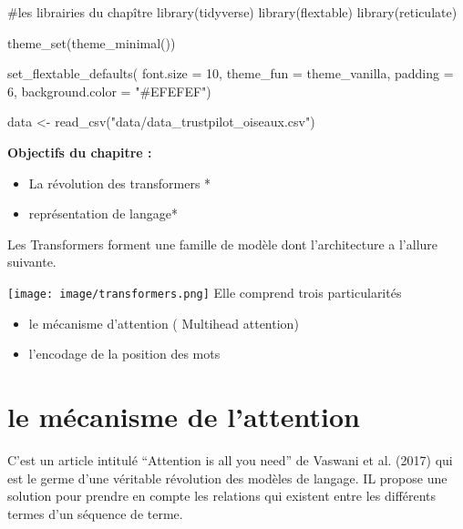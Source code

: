 \documentclass[
  letterpaper,
  DIV=11,
  numbers=noendperiod]{scrreprt}
\newenvironment{Shaded}{\begin{snugshade}}{\end{snugshade}}
\newcommand{\AttributeTok}[1]{\textcolor[rgb]{0.40,0.45,0.13}{#1}}
\newcommand{\CommentTok}[1]{\textcolor[rgb]{0.37,0.37,0.37}{#1}}
\newcommand{\DecValTok}[1]{\textcolor[rgb]{0.68,0.00,0.00}{#1}}
\newcommand{\FunctionTok}[1]{\textcolor[rgb]{0.28,0.35,0.67}{#1}}
\newcommand{\NormalTok}[1]{\textcolor[rgb]{0.00,0.23,0.31}{#1}}
\newcommand{\OtherTok}[1]{\textcolor[rgb]{0.00,0.23,0.31}{#1}}
\newcommand{\StringTok}[1]{\textcolor[rgb]{0.13,0.47,0.30}{#1}}
\providecommand{\tightlist}{%
  \setlength{\itemsep}{0pt}\setlength{\parskip}{0pt}}\usepackage{longtable,booktabs,array}
\begin{document}
\begin{Shaded}
\begin{Highlighting}[]
\CommentTok{\#les librairies du chapître}
\FunctionTok{library}\NormalTok{(tidyverse)}
\FunctionTok{library}\NormalTok{(flextable)}
\FunctionTok{library}\NormalTok{(reticulate)}

\FunctionTok{theme\_set}\NormalTok{(}\FunctionTok{theme\_minimal}\NormalTok{()) }

\FunctionTok{set\_flextable\_defaults}\NormalTok{(}
  \AttributeTok{font.size =} \DecValTok{10}\NormalTok{, }\AttributeTok{theme\_fun =}\NormalTok{ theme\_vanilla,}
  \AttributeTok{padding =} \DecValTok{6}\NormalTok{,}
  \AttributeTok{background.color =} \StringTok{"\#EFEFEF"}\NormalTok{)}


\NormalTok{data }\OtherTok{\textless{}{-}} \FunctionTok{read\_csv}\NormalTok{(}\StringTok{"data/data\_trustpilot\_oiseaux.csv"}\NormalTok{)}
\end{Highlighting}
\end{Shaded}

\textbf{Objectifs du chapitre :}

\begin{itemize}
\item
  La révolution des transformers *
\item
  représentation de langage*
\end{itemize}

Les Transformers forment une famille de modèle dont l'architecture a
l'allure suivante.

\texttt{[image: image/transformers.png]} Elle comprend trois
particularités

\begin{itemize}
\tightlist
\item
  le mécanisme d'attention ( Multihead attention)
\item
  l'encodage de la position des mots
\end{itemize}

\section{le mécanisme de
l'attention}\label{le-muxe9canisme-de-lattention}

C'est un article intitulé ``Attention is all you need'' de Vaswani et
al. (2017) qui est le germe d'une véritable révolution des modèles de
langage. IL propose une solution pour prendre en compte les relations
qui existent entre les différents termes d'un séquence de terme.
\end{document}
